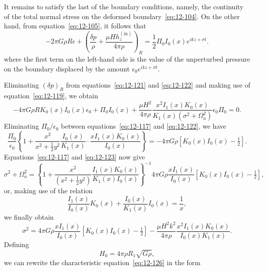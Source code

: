 It remains to satisfy the last of the boundary conditions, namely, the continuity of the total normal stress on the deformed boundary~\eqref{eq:12-104}. On the other hand, from equation~\eqref{eq:12-105}, it follows that
\begin{equation}
\label{eq:12-121}
-2\pi G\rho R\epsilon + \left(\frac{\delta p}{\rho} + \frac{\mu H h_z^{(\mathrm{in})}}{4\pi\rho}\right)_R = \frac{1}{2}\Pi_0 I_0(x) e^{ikz+\sigma t}.
\end{equation}
where the first term on the left-hand side is the value of the unperturbed pressure on the boundary displaced by the amount $\epsilon_0 e^{ikz+\sigma t}$.

Eliminating $(\delta p)_R$ from equations~\eqref{eq:12-121} and \eqref{eq:12-122} and making use of equation~\eqref{eq:12-119}, we obtain
\begin{equation}
\label{eq:12-122}
-4\pi G\rho R K_0(x)I_0(x)\epsilon_0 + \Pi_0 I_0(x) + \frac{\mu H^2}{4\pi\rho}\frac{x^2 I_1(x)K_0(x)}{K_1(x)(\sigma^2+\Omega_a^2)}\epsilon_0\Pi_0 = 0.
\end{equation}
Eliminating $\Pi_0/\epsilon_0$ between equations~\eqref{eq:12-117} and \eqref{eq:12-122}, we have
\begin{equation}
\label{eq:12-123}
\frac{\Pi_0}{\epsilon_0}\left\{1 + \frac{x^2}{x^2+\frac{1}{2}y^2}\frac{I_0(x)}{K_1(x)} \cdot \frac{x I_1(x)K_0(x)}{I_0(x)}\right\} = -4\pi G\rho [K_0(x)I_0(x)-\tfrac{1}{2}].
\end{equation}
Equations~\eqref{eq:12-117} and \eqref{eq:12-123} now give
\begin{equation}
\label{eq:12-124}
\sigma^2 + \Omega_a^2 = \left\{1 + \frac{x^2}{(x^2+\frac{1}{2}y^2)} \frac{I_1(x)K_0(x)}{K_1(x)I_0(x)}\right\}^{-1} 4\pi G\rho \frac{x I_1(x)}{I_0(x)}[K_0(x)I_0(x)-\tfrac{1}{2}],
\end{equation}
or, making use of the relation
\begin{equation}
\label{eq:12-125}
\frac{I_1(x)}{I_0(x)} K_0(x) + \frac{I_0(x)}{K_1(x)} I_0(x) = \frac{1}{x},
\end{equation}
we finally obtain
\begin{equation}
\label{eq:12-126}
\sigma^2 = 4\pi G\rho \frac{xI_1(x)}{I_0(x)}\left[K_0(x)I_0(x)-\tfrac{1}{2}\right] - \frac{\mu H^2 k^2}{4\pi\rho} \frac{x^2 I_1(x)K_0(x)}{I_0(x)K_1(x)}.
\end{equation}
Defining
\begin{equation}
\label{eq:12-127}
H_0 = 4\pi\rho R_1\sqrt{G\rho},
\end{equation}
we can rewrite the characteristic equation~\eqref{eq:12-126} in the form
